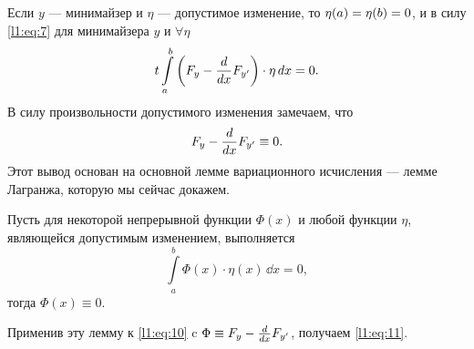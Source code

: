 Если $y$ --- минимайзер и $\eta$ --- допустимое изменение, то $\eta(a)=\eta(b)\?=0$, и в силу \eqref{l1:eq:7} для минимайзера $y$ и $\forall\eta$ {\mb 
}
\begin{equation}
	\label{l1:eq:10} 
	 t\int\limits_a^b\left(F_y-\frac{d}{dx}F_{y'}\right)\cdot\eta\,d{x}=0.
\end{equation}
В силу произвольности допустимого изменения замечаем, что 
\begin{equation}
	\label{l1:eq:11}
	 F_y-\frac{d}{dx}F_{y'}\equiv0.
\end{equation}
Этот вывод основан на основной лемме вариационного исчисления --- лемме Лагранжа, которую мы сейчас докажем.
\begin{Lemm}
	Пусть для некоторой непрерывной функции $\Phi(x)$ и любой функции $\eta$, являющейся допустимым изменением{\mb,} выполняется
	\begin{equation}
		\label{l1:eq:12}
		\int\limits_a^b \Phi(x)\cdot\eta(x)\,\dd{x}=0,
	\end{equation}
	тогда $\Phi(x)\equiv0$.
\end{Lemm}
\noindent Применив эту лемму к \eqref{l1:eq:10} c $\Phi\equiv F_y-\frac{d}{dx}F_{y'}$, получаем \eqref{l1:eq:11}.
